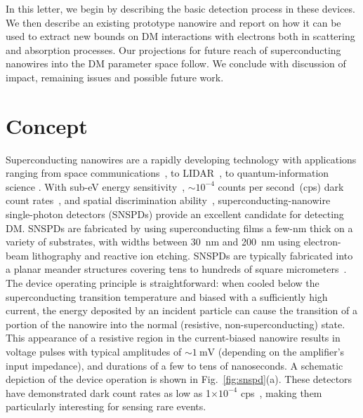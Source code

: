 \documentclass[twocolumn,10pt,prl,nofootinbib,preprintnumbers]{revtex4-1}
\begin{document}
In this letter, we begin by describing the basic detection process in
these devices. We then describe an existing prototype nanowire and
report on how it can be used to extract new bounds on DM interactions with
electrons both in scattering and absorption processes. 
Our projections for future reach of superconducting nanowires into the DM
parameter space follow. We conclude with discussion of impact, remaining
issues and possible future work.


\section{Concept}
%


Superconducting nanowires are a rapidly developing technology with
applications ranging from space communications~\cite{Grein2014,
  Grein2014b}, to LIDAR~\cite{McCarthy2013, Chen2017}, to
quantum-information science \cite{Natarajan2009}. With sub-eV energy
sensitivity~\cite{Marsili2012}, $\sim 10^{-4}$ counts per second~(cps) dark count
rates~\cite{Wollman2017}, and spatial discrimination
ability~\cite{Zhao2017}, superconducting-nanowire single-photon
detectors (SNSPDs) provide an excellent candidate for detecting
DM. SNSPDs are fabricated by using superconducting films a few-nm
thick on a variety of substrates, with widths between 30~nm and 200~nm
using electron-beam lithography and reactive ion etching. SNSPDs are
typically fabricated into a planar meander structures covering tens to
hundreds of square micrometers~\cite{Lv2017}. The device operating
principle is straightforward: when cooled below the superconducting
transition temperature and biased with a sufficiently high current,
the energy deposited by an incident particle can cause the transition of
a portion of the nanowire into the normal (resistive,
non-superconducting) state. This appearance of a resistive region in
the current-biased nanowire results in voltage pulses
with typical amplitudes of $\sim\SI{1}{\milli\volt}$ (depending on the
amplifier's input impedance), and durations of a few to tens of
nanoseconds. A schematic depiction of the device operation is shown in
Fig.~\ref{fig:snspd}(a). These detectors have demonstrated dark count
rates as low as 1$\times 10^{-4}$ cps~\cite{Wollman2017}, making them particularly interesting for
sensing rare events.
\end{document}
